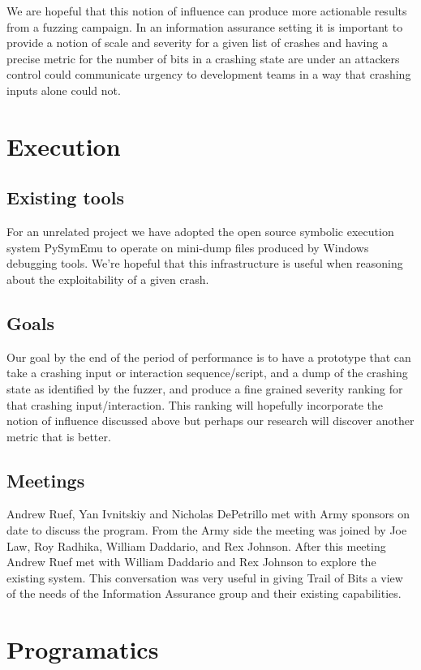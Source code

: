 \documentclass{article}
\begin{document}
We are hopeful that this notion of influence can produce more actionable
results from a fuzzing campaign. In an information assurance setting it is 
important to provide a notion of scale and severity for a given list of 
crashes and having a precise metric for the number of bits in a crashing state
are under an attackers control could communicate urgency to development 
teams in a way that crashing inputs alone could not.

\section{Execution}

\subsection{Existing tools}
For an unrelated project we have adopted the open source symbolic execution 
system PySymEmu\cite{pysymemu} to operate on mini-dump files produced by 
Windows debugging tools. We're hopeful that this infrastructure is useful when 
reasoning about the exploitability of a given crash. 

\subsection{Goals}
Our goal by the end of the period of performance is to have a prototype that
can take a crashing input or interaction sequence/script, and a dump of the
crashing state as identified by the fuzzer, and produce a fine grained 
severity ranking for that crashing input/interaction. This ranking will 
hopefully incorporate the notion of influence discussed above but perhaps
our research will discover another metric that is better.

\subsection{Meetings}
Andrew Ruef, Yan Ivnitskiy and Nicholas DePetrillo met with Army 
sponsors on date to discuss the program. From the Army side the meeting was 
joined by Joe Law, Roy Radhika, William Daddario, and Rex Johnson. After this meeting Andrew Ruef met with 
William Daddario and Rex Johnson to explore the existing system. This conversation was very 
useful in giving Trail of Bits a view of the needs of the Information 
Assurance group and their existing capabilities. 

\section{Programatics}
\end{document}
